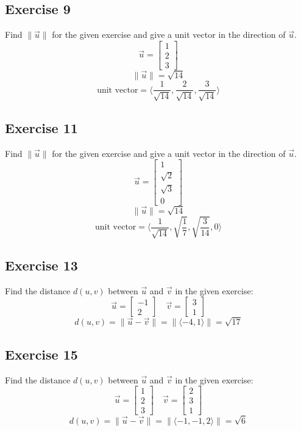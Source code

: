 \documentclass{math}
\begin{document}
\subsection*{Exercise 9}
Find \( \|\vec{u}\| \) for the given exercise and give a unit vector in the
direction of \( \vec{u} \).
\[ \vec{u} = \begin{bmatrix}1 \\ 2 \\ 3\end{bmatrix} \]
\[ \|\vec{u}\| = \sqrt{14} \]
\[ \text{unit vector} =
  \langle\frac{1}{\sqrt{14}},\frac{2}{\sqrt{14}},\frac{3}{\sqrt{14}}\rangle \]

\subsection*{Exercise 11}
Find \( \|\vec{u}\| \) for the given exercise and give a unit vector in the
direction of \( \vec{u} \).
\[ \vec{u} = \begin{bmatrix}1 \\ \sqrt{2} \\ \sqrt{3} \\ 0\end{bmatrix} \]
\[ \|\vec{u}\| = \sqrt{14} \]
\[ \text{unit vector} =
  \langle\frac{1}{\sqrt{14}},\sqrt{\frac{1}{7}},\sqrt{\frac{3}{14}},0\rangle \]

\subsection*{Exercise 13}
Find the distance \( d(u,v) \) between \( \vec{u} \) and \( \vec{v} \) in the
given exercise:
\[ \vec{u} = \begin{bmatrix}-1 \\ 2\end{bmatrix} \quad
  \vec{v} = \begin{bmatrix}3 \\ 1\end{bmatrix} \]
\[ d(u,v) = \|\vec{u}-\vec{v}\| = \|\langle-4,1\rangle\| = \sqrt{17} \]

\subsection*{Exercise 15}
Find the distance \( d(u,v) \) between \( \vec{u} \) and \( \vec{v} \) in the
given exercise:
\[ \vec{u} = \begin{bmatrix}1 \\ 2 \\ 3\end{bmatrix} \quad
  \vec{v} = \begin{bmatrix}2 \\ 3 \\ 1\end{bmatrix} \]
\[ d(u,v) = \|\vec{u}-\vec{v}\| = \|\langle-1,-1,2\rangle\| = \sqrt{6} \]
\end{document}
